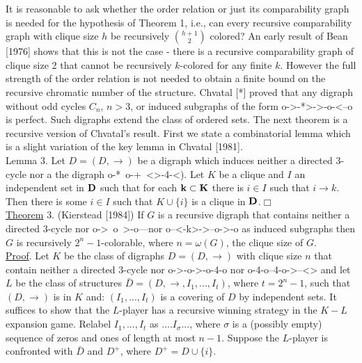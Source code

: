 \documentclass[twoside]{article}
\begin{document}
It is reasonable to ask whether the order relation or just its comparability graph is needed for the hypothesis of
Theorem 1, i.e., can every recursive comparability graph with clique size $h$ be recursively $\binom{h+1}{2}$ colored?   An early result of Bean [1976] shows that
this is not the case - there is a recursive comparability graph of clique size
2	that cannot be recursively   $k$-colored for any finite $k$.    However the full strength of the order relation is not needed to obtain a finite bound on the recursive chromatic number of the structure.    
Chvatal [*] proved that any digraph without odd cycles  $C_n$,  $n>3$, or induced subgraphs of the form o->-*>->-o-<--o   is perfect.   
Such digraphs extend the class of ordered sets. 
The next theorem is a recursive version of Chvatal's result.   
First we state a combinatorial lemma which is a slight variation of the key lemma in Chvatal [1981].\\
\newline
Lemma 3.    Let   $D = (D, \rightarrow)$ be a digraph which induces neither a directed 3-cycle nor a the digraph o-*~o-+~<>-4-<).    
Let   $K$   be a clique and $I$ an independent set in   $\mathbf{D}$   such that for each   $\mathbf{k\subset K}$   there is  $i\in I$   such that $i\rightarrow k$. 
Then there is some $i\in I$   such that   $K\cup \{i\}$ is a clique in $\mathbf{D}$.$\Box$\\
\newline
\underline{Theorem} 3. (Kierstead [1984]) If   $G$   is a recursive digraph that contains neither a directed 3-cycle nor o->~o~>-o—nor o--<-k>->--o->-o   as induced
\newpage
%
%
subgraphs then $G$ is recursively $2^n-1$-colorable, where $n = \omega(G)$, the clique size of $G$.\\
\newline
\underline{Proof}.    Let   $K$   be the class of digraphs   $D = (D,\rightarrow)$   with clique size   $n$ that contain neither a directed 3-cycle nor o->-o->-o-4-o   nor   o-4-o--4-o->--<> and let   $L$   be the class of structures   $\bar{D} = (D,\rightarrow,I_1,...,I_t)$, where   $t = 2^n - 1$, such that    $(D,\rightarrow)$    is in   $K$   and:  $(I_1,...,I_t)$    is a covering of   $D$ by independent sets.    
It suffices to show that the   $L$-player has a recursive winning strategy in the   $K-L$   expansion game.   
Relabel   $I_1,...,I_t$ as $....I_\sigma...$, where $\sigma$   is a (possibly empty) sequence of zeros and ones of length at most   $n-1$.    Suppose the   $L$-player is confronted with  $\bar{D}$   and   $D^+$, where   $D^+ = D\cup \{i\}$.    
\end{document}

